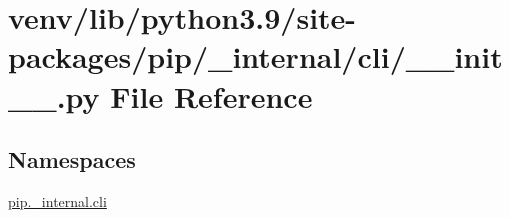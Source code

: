 \hypertarget{venv_2lib_2python3_89_2site-packages_2pip_2__internal_2cli_2____init_____8py}{}\section{venv/lib/python3.9/site-\/packages/pip/\+\_\+internal/cli/\+\_\+\+\_\+init\+\_\+\+\_\+.py File Reference}
\label{venv_2lib_2python3_89_2site-packages_2pip_2__internal_2cli_2____init_____8py}
\subsection*{Namespaces}
\begin{DoxyCompactItemize}
\item 
 \hyperlink{namespacepip_1_1__internal_1_1cli}{pip.\+\_\+internal.\+cli}
\end{DoxyCompactItemize}
